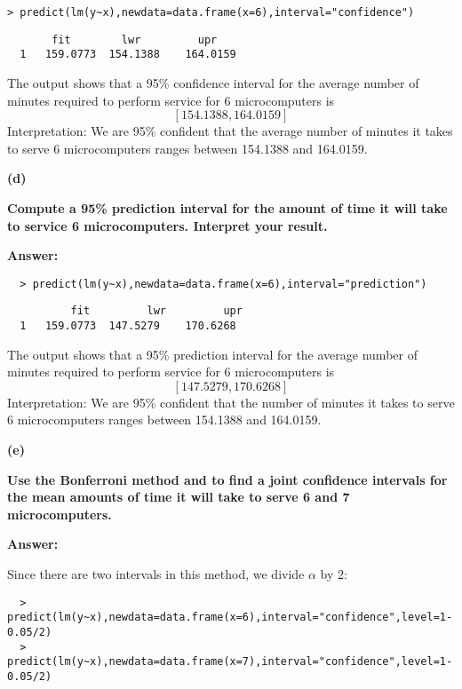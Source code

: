 \documentclass[letterpaper,11pt]{article}
\begin{document}
\begin{lstlisting}
> predict(lm(y~x),newdata=data.frame(x=6),interval="confidence")
\end{lstlisting}

\begin{lstlisting}
       fit	      lwr	      upr
  1	  159.0773	154.1388	164.0159
\end{lstlisting}

The output shows that a 95\% confidence interval for the average number of minutes required to perform service for 6 microcomputers is $$[154.1388, 164.0159]$$
Interpretation: We are 95\% confident that the average number of minutes it takes to serve 6 microcomputers ranges between 154.1388 and 164.0159.
  \bigbreak
  \begin{addmargin}[-1.1em]{0em}
  \textbf{(d)}\par\end{addmargin}
    \textbf{Compute a 95\% prediction interval for the amount of time it will take to service 6 microcomputers. Interpret your result.
}\par

  \bigbreak
  \begin{addmargin}[-0.5em]{0em}
  \textbf{Answer: }\end{addmargin}
  \begin{lstlisting}
  > predict(lm(y~x),newdata=data.frame(x=6),interval="prediction")
  \end{lstlisting}

\begin{lstlisting}
          fit	      lwr	      upr
  1	  159.0773	147.5279	170.6268
\end{lstlisting}
The output shows that a 95\% prediction interval for the average number of minutes required to perform service for 6 microcomputers is $$[147.5279, 170.6268]$$
Interpretation: We are 95\% confident that the number of minutes it takes to serve 6 microcomputers ranges between 154.1388 and 164.0159.

  \bigbreak
  \begin{addmargin}[-1.1em]{0em}
  \textbf{(e)}\par\end{addmargin}
    \textbf{Use the Bonferroni method and to find a joint confidence intervals for the mean amounts of time it will take to serve 6 and 7 microcomputers.}\par
  \bigbreak
  \begin{addmargin}[-0.5em]{0em}
  \textbf{Answer: }\end{addmargin}
Since there are two intervals in this method, we divide $\alpha$ by 2:
\begin{lstlisting}
  > predict(lm(y~x),newdata=data.frame(x=6),interval="confidence",level=1-0.05/2)
  > predict(lm(y~x),newdata=data.frame(x=7),interval="confidence",level=1-0.05/2)
\end{lstlisting}
\end{document}
